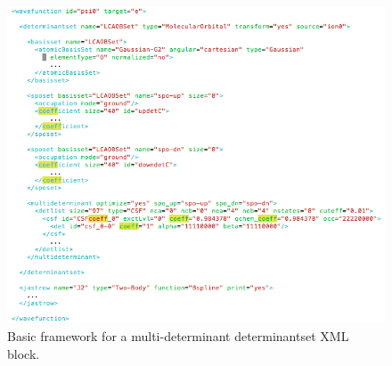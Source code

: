 \begin{figure}[ht!]
\begin{center}
\includegraphics[trim = 0mm 0mm 0mm 0mm, clip,width=1.0\columnwidth]{figures/lab_advanced_molecules_xml_multideterminant.png}
\end{center}
\caption{Basic framework for a multi-determinant determinantset XML block.}
\label{fig:lam_xml_multideterminant}
\end{figure}

